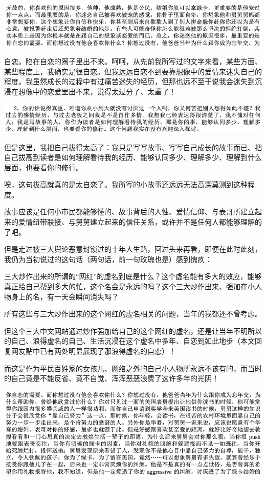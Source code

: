 \documentclass[9pt, b5paper]{article}
\begin{document}
\begin{center}
\includegraphics[width=.9\linewidth]{./pic/p1p109-3.png}
\end{center}

自恋。陷在自恋的圈子里出不来。呵呵，从先前我所写过的文字来看，某些方面、某些程度上，我确实是很自恋。但我远远自恋不到要靠想像中的爱情来迷失自己的程度。我虽然成长的过程中有过痛苦迷失的经历，但那也远不至于说我会迷失到沉浸在想像中的恋爱里出不来，说得太过分了、太重了！

\begin{center}
\includegraphics[width=.9\linewidth]{./pic/p1p114-3.png}
\end{center}

但是这里，我把自己拔得太高了：我只是写写故事、写写自己成长的故事而已、把自己拔高到读者是如何理解看待我的经历、能够认同多少、理解多少、理解到什么层面，也要看你的修行。

唉，这句拔高就真的是太自恋了。我所写的小故事还远远无法高深莫测到这种程度。

故事应该是任何小市民都能够懂的、故事背后的人性、爱情信仰、与表哥所建立起来的爱情纽带联接、与舅舅建立起来的信任关系，或许并不是任何人都能够理解的了吧。 

但是走过被三大舆论恶意封锁过的十年人生路，回过头来再看，即便在此时此刻，我仍为当初说过的这句话（两句话，前一句玫瑰也是）感到愧疚：

三大炒作出来的所谓的“网红”的虚名到底是什么？这个虚名能有多大的效应，能够真正给自己帮到多大的忙，这个名会是永远的吗？这个三大炒作出来、强加在小人物身上的名，有一天会瞬间消失吗？

所有这些与三大炒作出来的这个网红的虚名相关的问题，当年的我都还不曾考虑。

但这个三大中文网站通过炒作强加给自己的这个网红的虚名，还是让当年不明所以的自己、浪得虚名的自己、生活沉浸在这个虚名中多年、自恋到如此地步（本文回复网友贴中已有两处明显展现了那浪得虚名的自恋）！

而这是作为平民百姓家的女孩儿、网络之外的自己小人物所永远不该有的，而当时的自己竟是不能反省、竟不自觉、浑浑恶恶浪费了这许多年的光阴！

\begin{center}
\includegraphics[width=.9\linewidth]{./pic/p1p109-4.png}
\end{center}
\end{document}
